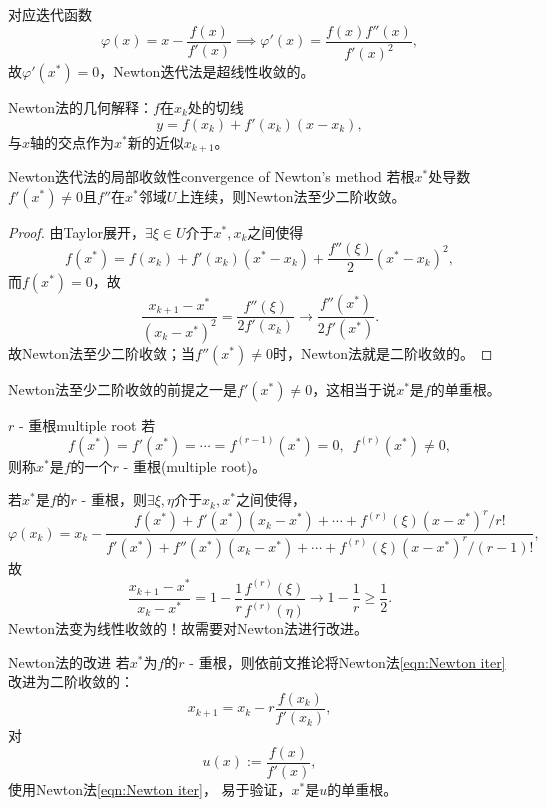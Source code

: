 \begin{corollary}
    对应迭代函数
    \[
        \varphi(x)=x-\frac{f(x)}{f'(x)}\implies\varphi'(x)=\frac{f(x)f''(x)}{f'(x)^2},
    \]
    故$\varphi'(x^*)=0$，Newton迭代法是超线性收敛的。
\end{corollary}

\begin{remark}
    Newton法的几何解释：$f$在$x_k$处的切线
    \[
        y=f(x_k)+f'(x_k)(x-x_k),
    \]
    与$x$轴的交点作为$x^*$新的近似$x_{k+1}$。
\end{remark}

\begin{theorem}
    {Newton迭代法的局部收敛性}{convergence of Newton's method}
    若根$x^*$处导数$f'(x^*)\neq 0$且$f''$在$x^*$邻域$U$上连续，则Newton法至少二阶收敛。
\end{theorem}

\begin{proof}
    由Taylor展开，$\exists\xi\in U$介于$x^*,x_k$之间使得
    \[
        f(x^*)=f(x_k)+f'(x_k)(x^*-x_k)+\frac{f''(\xi)}2(x^*-x_k)^2,
    \]
    而$f(x^*)=0$，故
    \[
        \frac{x_{k+1}-x^*}{(x_k-x^*)^2}=\frac{f''(\xi)}{2f'(x_k)}\to\frac{f''(x^*)}{2f'(x^*)}.
    \]
    故Newton法至少二阶收敛；当$f''(x^*)\neq 0$时，Newton法就是二阶收敛的。
\end{proof}

\begin{remark}
    Newton法至少二阶收敛的前提之一是$f'(x^*)\neq 0$，这相当于说$x^*$是$f$的单重根。
\end{remark}

\begin{definition}
    {$r$ - 重根}{multiple root}
    若
    \[
        f(x^*)=f'(x^*)=\cdots=f^{(r-1)}(x^*)=0,\enspace f^{(r)}(x^*)\neq 0,
    \]
    则称$x^*$是$f$的一个$r$ - 重根(multiple root)。
\end{definition}

\begin{corollary}
    若$x^*$是$f$的$r$ - 重根，则$\exists\xi,\eta$介于$x_k,x^*$之间使得，
    \[
        \varphi(x_k)=x_k-\frac{f(x^*)+f'(x^*)(x_k-x^*)+\cdots+f^{(r)}(\xi)(x-x^*)^r/r!}{f'(x^*)+f''(x^*)(x_k-x^*)+\cdots+f^{(r)}(\xi)(x-x^*)^r/(r-1)!},
    \]
    故
    \[
        \frac{x_{k+1}-x^*}{x_k-x^*}=1-\frac1r\frac{f^{(r)}(\xi)}{f^{(r)}(\eta)}\to1-\frac1r\geq\frac12.
    \]
    Newton法变为线性收敛的！故需要对Newton法进行改进。
\end{corollary}

\begin{theorem}
    {Newton法的改进}{}
    若$x^*$为$f$的$r$ - 重根，则依前文推论将Newton法\eqref{eqn:Newton iter}改进为二阶收敛的： 
    \begin{equation}
        \label{eqn:Newton iter r-multiroot}
        x_{k+1}=x_k-r\frac{f(x_k)}{f'(x_k)},
    \end{equation}
    \tcblower
    对
    \begin{equation}
        u(x):=\frac{f(x)}{f'(x)},
    \end{equation}
    使用Newton法\eqref{eqn:Newton iter}，
    易于验证，$x^*$是$u$的单重根。
\end{theorem}

